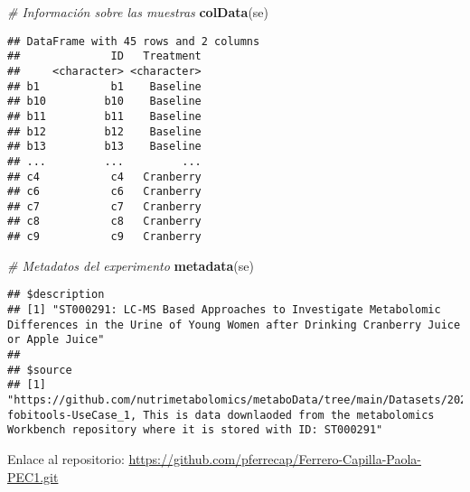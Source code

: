 \documentclass[
]{article}
\newenvironment{Shaded}{\begin{snugshade}}{\end{snugshade}}
\newcommand{\CommentTok}[1]{\textcolor[rgb]{0.56,0.35,0.01}{\textit{#1}}}
\newcommand{\FunctionTok}[1]{\textcolor[rgb]{0.13,0.29,0.53}{\textbf{#1}}}
\newcommand{\NormalTok}[1]{#1}
\begin{document}
\begin{Shaded}
\begin{Highlighting}[]
\CommentTok{\# Información sobre las muestras}
\FunctionTok{colData}\NormalTok{(se)}
\end{Highlighting}
\end{Shaded}

\begin{verbatim}
## DataFrame with 45 rows and 2 columns
##              ID   Treatment
##     <character> <character>
## b1           b1    Baseline
## b10         b10    Baseline
## b11         b11    Baseline
## b12         b12    Baseline
## b13         b13    Baseline
## ...         ...         ...
## c4           c4   Cranberry
## c6           c6   Cranberry
## c7           c7   Cranberry
## c8           c8   Cranberry
## c9           c9   Cranberry
\end{verbatim}

\begin{Shaded}
\begin{Highlighting}[]
\CommentTok{\# Metadatos del experimento}
\FunctionTok{metadata}\NormalTok{(se)}
\end{Highlighting}
\end{Shaded}

\begin{verbatim}
## $description
## [1] "ST000291: LC-MS Based Approaches to Investigate Metabolomic Differences in the Urine of Young Women after Drinking Cranberry Juice or Apple Juice"
## 
## $source
## [1] "https://github.com/nutrimetabolomics/metaboData/tree/main/Datasets/2024-fobitools-UseCase_1, This is data downlaoded from the metabolomics Workbench repository where it is stored with ID: ST000291"
\end{verbatim}

Enlace al repositorio:
\url{https://github.com/pferrecap/Ferrero-Capilla-Paola-PEC1.git}
\end{document}
